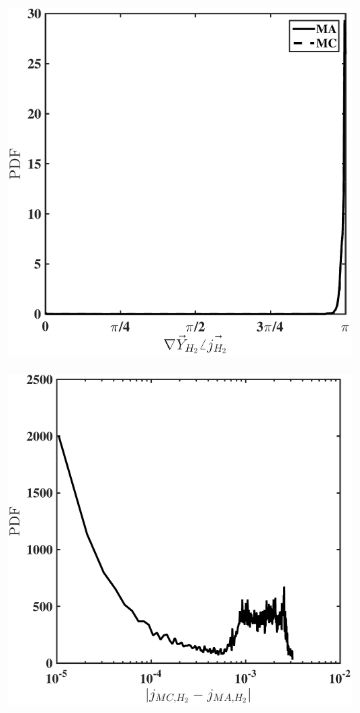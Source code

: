 \documentclass[preprint,review,12pt]{elsarticle}
\begin{document}
\begin{figure}[htb]
    \begin{subfigure}{0.33\textwidth}
        \centering
            \includegraphics[width=\textwidth]{Angle_PDF.pdf}
        \caption{}\label{A priori (a)}
    \end{subfigure}
    \begin{subfigure}{0.33\textwidth}
        \centering
            \includegraphics[width=\textwidth]{Flux_diff_PDF.pdf}

\end{subfigure}
\end{figure}
\end{document}
